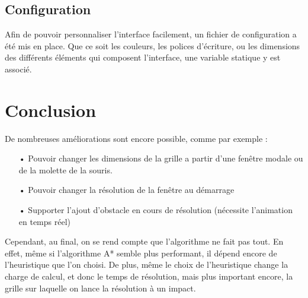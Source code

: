 \documentclass{report}
\begin{document}
	\section{Configuration}
	Afin de pouvoir personnaliser l'interface facilement, un fichier de configuration a été mis en place.
	Que ce soit les couleurs, les polices d'écriture, ou les dimensions des différents éléments qui composent l'interface, 
	une variable statique y est associé.
	
\chapter*{Conclusion}
De nombreuses améliorations sont encore possible, comme par exemple :
	\begin{itemize}
		\item[•] Pouvoir changer les dimensions de la grille a partir d'une fenêtre modale ou de la molette de la souris.
		\item[•] Pouvoir changer la résolution de la fenêtre au démarrage
		\item[•] Supporter l'ajout d'obstacle en cours de résolution (nécessite l'animation en temps réel)
	\end{itemize}
Cependant, au final, on se rend compte que l'algorithme ne fait pas tout. 
En effet, même si l'algorithme A* semble plus performant, il dépend encore de l'heuristique que l'on choisi. 
De plus, même le choix de l'heuristique change la charge de calcul, et donc le temps de résolution, mais plus important encore, la grille sur laquelle on lance la résolution à un impact.




\end{document}
